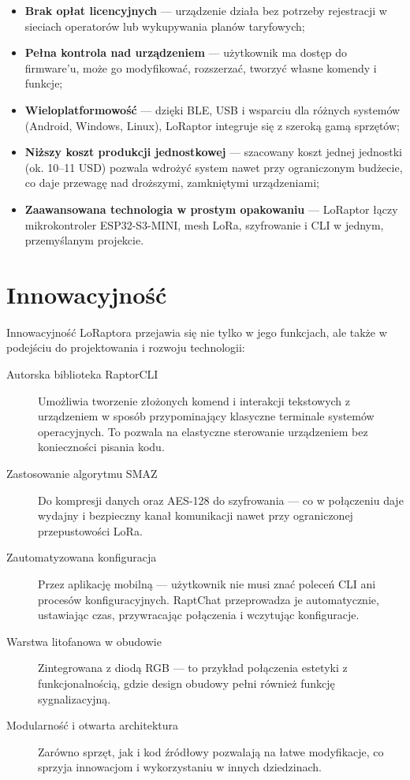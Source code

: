 \begin{itemize}
	\item \textbf{Brak opłat licencyjnych} --- urządzenie działa bez potrzeby rejestracji w sieciach operatorów lub wykupywania planów taryfowych;
	
	\item \textbf{Pełna kontrola nad urządzeniem} --- użytkownik ma dostęp do firmware'u, może go modyfikować, rozszerzać, tworzyć własne komendy i funkcje;
	
	\item \textbf{Wieloplatformowość} --- dzięki BLE, USB i wsparciu dla różnych systemów (Android, Windows, Linux), LoRaptor integruje się z szeroką gamą sprzętów;
	
	\item \textbf{Niższy koszt produkcji jednostkowej} --- szacowany koszt jednej jednostki (ok. 10--11 USD) pozwala wdrożyć system nawet przy ograniczonym budżecie, co daje przewagę nad droższymi, zamkniętymi urządzeniami;
	
	\item \textbf{Zaawansowana technologia w prostym opakowaniu} --- LoRaptor łączy mikrokontroler ESP32-S3-MINI, mesh LoRa, szyfrowanie i CLI w jednym, przemyślanym projekcie.
\end{itemize}

\clearpage
\section{Innowacyjność}

Innowacyjność LoRaptora przejawia się nie tylko w jego funkcjach, ale także w podejściu do projektowania i rozwoju technologii:

\begin{description}
	\item[Autorska biblioteka RaptorCLI]
	Umożliwia tworzenie złożonych komend i interakcji tekstowych z urządzeniem w sposób przypominający klasyczne terminale systemów operacyjnych. To pozwala na elastyczne sterowanie urządzeniem bez konieczności pisania kodu.
	
	\item[Zastosowanie algorytmu SMAZ]
	Do kompresji danych oraz AES-128 do szyfrowania --- co w połączeniu daje wydajny i bezpieczny kanał komunikacji nawet przy ograniczonej przepustowości LoRa.
	
	\item[Zautomatyzowana konfiguracja]
	Przez aplikację mobilną --- użytkownik nie musi znać poleceń CLI ani procesów konfiguracyjnych. RaptChat przeprowadza je automatycznie, ustawiając czas, przywracając połączenia i wczytując konfiguracje.
	
	\item[Warstwa litofanowa w obudowie]
	Zintegrowana z diodą RGB --- to przykład połączenia estetyki z funkcjonalnością, gdzie design obudowy pełni również funkcję sygnalizacyjną.
	
	\item[Modularność i otwarta architektura]
	Zarówno sprzęt, jak i kod źródłowy pozwalają na łatwe modyfikacje, co sprzyja innowacjom i wykorzystaniu w innych dziedzinach.
\end{description}

